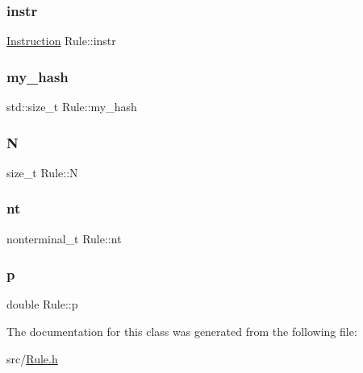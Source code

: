 \subsubsection{\texorpdfstring{instr}{instr}}
{\footnotesize\ttfamily \hyperlink{class_instruction}{Instruction} Rule\+::instr}

\mbox{\label{class_rule_af2d873c97e2de425f14a5a980dbcc104}} 
\subsubsection{\texorpdfstring{my\+\_\+hash}{my\_hash}}
{\footnotesize\ttfamily std\+::size\+\_\+t Rule\+::my\+\_\+hash\hspace{0.3cm}{\ttfamily [protected]}}

\mbox{\label{class_rule_a0a2a742af39b60831ad1ac5eb5ba7498}} 
\subsubsection{\texorpdfstring{N}{N}}
{\footnotesize\ttfamily size\+\_\+t Rule\+::N}

\mbox{\label{class_rule_a980385e76137909454bd6a585bd2e138}} 
\subsubsection{\texorpdfstring{nt}{nt}}
{\footnotesize\ttfamily nonterminal\+\_\+t Rule\+::nt}

\mbox{\label{class_rule_acd7e4d41d59dec76f60ca16238ab391a}} 
\subsubsection{\texorpdfstring{p}{p}}
{\footnotesize\ttfamily double Rule\+::p}



The documentation for this class was generated from the following file\+:\begin{DoxyCompactItemize}
\item 
src/\hyperlink{_rule_8h}{Rule.\+h}\end{DoxyCompactItemize}
